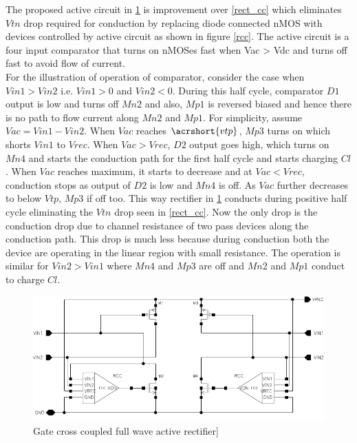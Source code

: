 \documentclass[UKenglish]{ifimaster}  %
\begin{document}
The proposed active circuit in \ref{rect_rcc} is improvement over \ref{rect_cc} which eliminates $Vtn$ drop required for conduction by replacing diode connected nMOS with devices controlled by active circuit as shown in figure \ref{rcc}. The active circuit is a four input comparator that turns on nMOSes fast when Vac > Vdc and turns off fast to avoid flow of current. \\

For the illustration of operation of comparator, consider the case when $Vin1 > Vin2$ i.e. $Vin1 > 0$ and $Vin2 < 0$. During this half cycle, comparator $D1$ output is low and turns off $Mn2$ and also, $Mp1$ is reversed biased and hence there is no path to flow current along $Mn2$ and $Mp1$. For simplicity, assume $Vac =  Vin1 - Vin2$. When $Vac$ reaches $\acrshort{vtp}$, $Mp3$ turns on which shorts $Vin1$ to $Vrec$. When $Vac > Vrec$, $D2$ output goes high, which turns on $Mn4$ and starts the conduction path for the first half cycle and starts charging $Cl$. When $Vac$ reaches maximum, it starts to decrease and at $Vac < Vrec$, conduction stops as output of $D2$ is low and $Mn4$ is off. As $Vac$ further decreases to below $Vtp$, $Mp3$ if off too. This way rectifier in \ref{rect_rcc}  conducts during positive half cycle eliminating the $Vtn$ drop seen in \ref{rect_cc}. Now the only drop is the conduction drop due to channel resistance of two pass devices along the conduction path. This drop is much less because during conduction both the device are operating in the linear region with small resistance. The operation is similar for $Vin2 > Vin1$ where $Mn4$ and $Mp3$ are off and $Mn2$ and $Mp1$ conduct to charge $Cl$. \\

\begin{figure}[htbp] %
   \centering
   \includegraphics[width=\textwidth]{img/rectifier_schematic.pdf} 
   \caption{Gate cross coupled full wave active rectifier]}
   \label{rect_rcc}
\end{figure}
\end{document}
